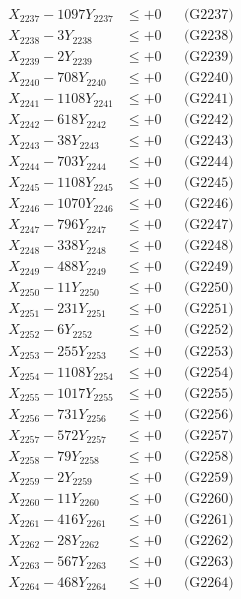\documentclass[a4paper,10pt]{article}
\begin{document}
{\begin{align}
X_{2237} - 1097Y_{2237} &\leq +0 && \text{(G2237)} \\
X_{2238} - 3Y_{2238} &\leq +0 && \text{(G2238)} \\
X_{2239} - 2Y_{2239} &\leq +0 && \text{(G2239)} \\
X_{2240} - 708Y_{2240} &\leq +0 && \text{(G2240)} \\
\allowbreak
X_{2241} - 1108Y_{2241} &\leq +0 && \text{(G2241)} \\
X_{2242} - 618Y_{2242} &\leq +0 && \text{(G2242)} \\
X_{2243} - 38Y_{2243} &\leq +0 && \text{(G2243)} \\
X_{2244} - 703Y_{2244} &\leq +0 && \text{(G2244)} \\
X_{2245} - 1108Y_{2245} &\leq +0 && \text{(G2245)} \\
X_{2246} - 1070Y_{2246} &\leq +0 && \text{(G2246)} \\
X_{2247} - 796Y_{2247} &\leq +0 && \text{(G2247)} \\
X_{2248} - 338Y_{2248} &\leq +0 && \text{(G2248)} \\
X_{2249} - 488Y_{2249} &\leq +0 && \text{(G2249)} \\
X_{2250} - 11Y_{2250} &\leq +0 && \text{(G2250)} \\
\allowbreak
X_{2251} - 231Y_{2251} &\leq +0 && \text{(G2251)} \\
X_{2252} - 6Y_{2252} &\leq +0 && \text{(G2252)} \\
X_{2253} - 255Y_{2253} &\leq +0 && \text{(G2253)} \\
X_{2254} - 1108Y_{2254} &\leq +0 && \text{(G2254)} \\
X_{2255} - 1017Y_{2255} &\leq +0 && \text{(G2255)} \\
X_{2256} - 731Y_{2256} &\leq +0 && \text{(G2256)} \\
X_{2257} - 572Y_{2257} &\leq +0 && \text{(G2257)} \\
X_{2258} - 79Y_{2258} &\leq +0 && \text{(G2258)} \\
X_{2259} - 2Y_{2259} &\leq +0 && \text{(G2259)} \\
X_{2260} - 11Y_{2260} &\leq +0 && \text{(G2260)} \\
\allowbreak
X_{2261} - 416Y_{2261} &\leq +0 && \text{(G2261)} \\
X_{2262} - 28Y_{2262} &\leq +0 && \text{(G2262)} \\
X_{2263} - 567Y_{2263} &\leq +0 && \text{(G2263)} \\
X_{2264} - 468Y_{2264} &\leq +0 && \text{(G2264)} \\

\end{align}}
\end{document}
